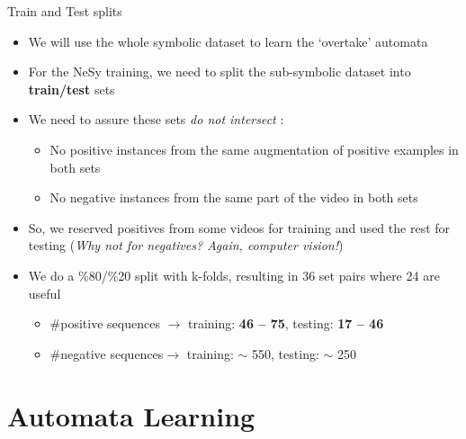 \documentclass[10pt, aspectratio=169]{beamer}
\begin{document}
\begin{frame}{Train and Test splits}
    \begin{itemize}
        \setlength{\itemsep}{10pt}
        \item We will use the whole symbolic dataset to learn the `overtake' automata
        \item For the NeSy training, we need to split the sub-symbolic dataset into \textbf{train/test} sets
        \item We need to assure these sets \textit{do not intersect} :
        \vspace{5pt}
        \begin{itemize}
            \setlength{\itemsep}{3pt}
            \item No positive instances from the same augmentation of positive examples in both sets
            \item No negative instances from the same part of the video in both sets
        \end{itemize}
        \item So, we reserved positives from some videos for training and used the rest for testing \textcolor{umBlueLighter}{\small (\textit{Why not for negatives? Again, computer vision!})}
        \item We do a \%80/\%20 split with k-folds, resulting in 36 set pairs where 24 are useful
        \vspace{5pt}
        \begin{itemize}
            \setlength{\itemsep}{3pt}
            \item \#positive sequences $\rightarrow$ training:  \textbf{46 -- 75}, testing: \textbf{17 -- 46} %
            \item \#negative sequences$\rightarrow$ training: $\sim$ 550, testing: $\sim$ 250
        \end{itemize}
    \end{itemize}
\end{frame}


\section{Automata Learning}
{
    \begin{frame}
        \sectionpage%
    \end{frame}
}
\end{document}
